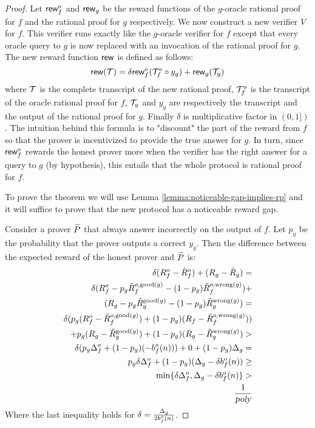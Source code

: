 \begin{proof}
Let $\mathsf{rew}^o_f$ and $\mathsf{rew}_g$ be the reward functions of the $g$-oracle rational proof for $f$ and the rational proof for $g$ respectively.
We now construct a new verifier $V$ for $f$. This verifier runs exactly like the $g$-oracle verifier for $f$ except that every oracle query to $g$ is now replaced with an invocation of the rational proof for $g$.
The new reward function $\mathsf{rew}$ is defined as follows:
$$ \mathsf{rew}(\mathcal{T}) = \delta \mathsf{rew}^o_f(\mathcal{T}^o_f \circ y_g)  + \mathsf{rew}_g(\mathcal{T}_g)$$
where $\mathcal{T}$ is the complete transcript of the new rational proof, $\mathcal{T}^o_f$ is the transcript of the oracle rational proof for $f$,  $\mathcal{T}_g$ and $y_g$ are respectively the transcript and  the output of the rational proof for $g$. Finally $\delta$ is multiplicative factor in $(0,1])$. The intuition behind this formula is to "discount" the part of the reward from $f$ so that the prover is incentivized to provide the true answer for $g$. In turn, since $\mathsf{rew}^o_f$ rewards the honest prover more when  the verifier has the right answer for a query to $g$ (by hypothesis), this entails that the whole protocol is rational proof for $f$.

To prove the theorem we will use Lemma \ref{lemma:noticeable-gap-implies-rp} and it will suffice to prove that the new protocol has a noticeable reward gap.
\newcommand{\pg}{p_{g}}
\newcommand{\Rf}{R_f^o}
\newcommand{\disRf}{\tilde{R}_f^o}
\newcommand{\disRfGoodg}{\tilde{R}_f^{o,\text{good}(g)}}
\newcommand{\disRfWrongg}{\tilde{R}_f^{o,\text{wrong}(g)}}
\newcommand{\disRgGoodg}{\tilde{R}_g^{\text{good}(g)}}
\newcommand{\disRgWrongg}{\tilde{R}_g^{\text{wrong}(g)}}
\newcommand{\Rfmax}{b^o_f(n)}


Consider a prover $\widetilde{P}$ that always answer incorrectly on the output of $f$. 
Let $\pg$ be the probability that the prover outputs a correct $y_g$. %
Then the difference between the expected reward of the honest prover and $\widetilde{P}$ is:
\setcounter{equation}{0}
\begin{align}
 \delta(\Rf - \disRf) + (R_g - \disR_g)  = \\
 \delta(\Rf - \pg \disRfGoodg - (1-\pg)\disRfWrongg) + \nonumber  \\ (R_g - \pg \disRgGoodg - (1-\pg)\disRgWrongg)  = \\
 \delta(\pg(\Rf - \disRfGoodg) + (1-\pg)(R_f - \disRfWrongg)) \nonumber \\ + \pg(R_g - \disRgGoodg) + (1-\pg)(R_g-\disRgWrongg)  > \\
 \delta(\pg \rewGap^o_f + (1-\pg)(-\Rfmax)) + 0 + (1-\pg)\rewGap_g  = \\
 \pg\delta\rewGap^o_f + (1-\pg)(\rewGap_g - \delta \Rfmax)  \geq \\
 \min\{\delta \rewGap^o_f, \rewGap_g - \delta\Rfmax \}  > \\
\invPoly
\end{align}
Where the last inequality holds for $\delta = \frac{\rewGap_g}{2\Rfmax}$.


\end{proof}
